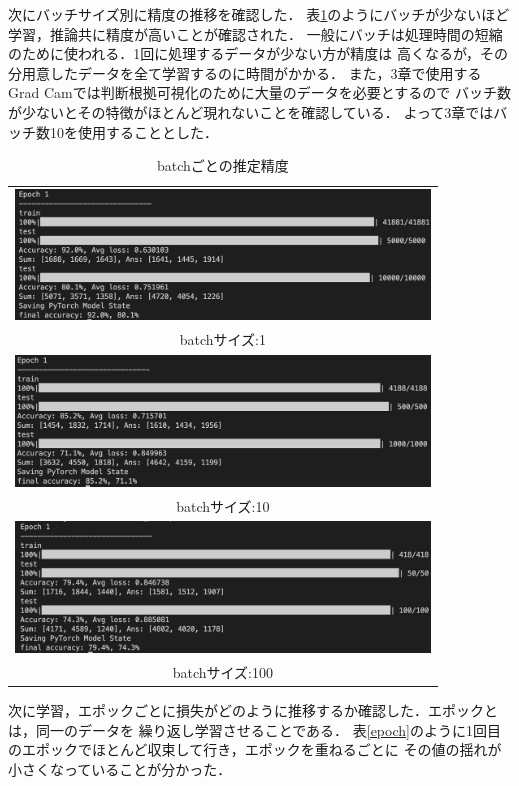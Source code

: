次にバッチサイズ別に精度の推移を確認した．
表\ref{batch}のようにバッチが少ないほど学習，推論共に精度が高いことが確認された．
一般にバッチは処理時間の短縮のために使われる．1回に処理するデータが少ない方が精度は
高くなるが，その分用意したデータを全て学習するのに時間がかかる．
また，3章で使用するGrad Camでは判断根拠可視化のために大量のデータを必要とするので
バッチ数が少ないとその特徴がほとんど現れないことを確認している．
よって3章ではバッチ数10を使用することとした．

\begin{table}[b]
  \begin{center}
    \begin{tabular}{c}
        \includegraphics[width=110mm]{images/net_result/batch1.png} \\ batchサイズ:1 \\
        \includegraphics[width=110mm]{images/net_result/batch10.png} \\ batchサイズ:10 \\
        \includegraphics[width=110mm]{images/net_result/batch100.png} \\ batchサイズ:100 \\
    \end{tabular}
  \end{center}
  \caption{batchごとの推定精度}
  \label{batch}
\end{table}
\clearpage

次に学習，エポックごとに損失がどのように推移するか確認した．エポックとは，同一のデータを
繰り返し学習させることである．
表\ref{epoch}のように1回目のエポックでほとんど収束して行き，エポックを重ねるごとに
その値の揺れが小さくなっていることが分かった．

